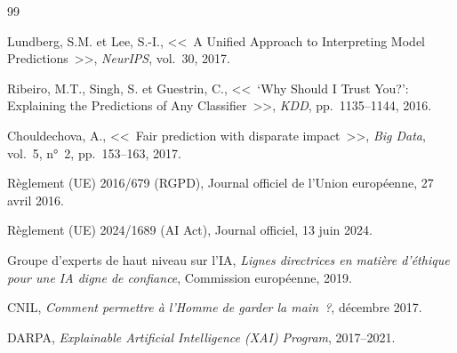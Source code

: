 \documentclass[12pt,a4paper]{article}
\begin{document}
\newpage
\begin{thebibliography}{99}

Lundberg, S.M. et Lee, S.-I., <<~A Unified Approach to Interpreting Model Predictions~>>, \textit{NeurIPS}, vol.~30, 2017.

Ribeiro, M.T., Singh, S. et Guestrin, C., <<~`Why Should I Trust You?': Explaining the Predictions of Any Classifier~>>, \textit{KDD}, pp.~1135--1144, 2016.

Chouldechova, A., <<~Fair prediction with disparate impact~>>, \textit{Big Data}, vol.~5, n°~2, pp.~153--163, 2017.

Règlement (UE) 2016/679 (RGPD), Journal officiel de l'Union européenne, 27 avril 2016.

Règlement (UE) 2024/1689 (AI Act), Journal officiel, 13 juin 2024.

Groupe d'experts de haut niveau sur l'IA, \textit{Lignes directrices en matière d'éthique pour une IA digne de confiance}, Commission européenne, 2019.

CNIL, \textit{Comment permettre à l'Homme de garder la main~?}, décembre 2017.

DARPA, \textit{Explainable Artificial Intelligence (XAI) Program}, 2017--2021.

\end{thebibliography}
\end{document}
